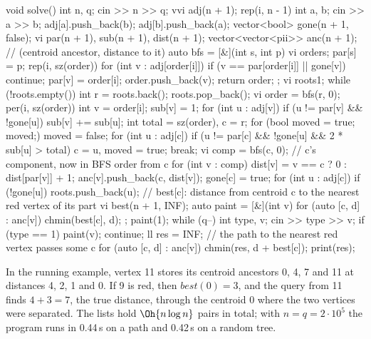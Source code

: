 \begin{code}
void solve() {
    int n, q;
    cin >> n >> q;
    vvi adj(n + 1);
    rep(i, n - 1) {
        int a, b;
        cin >> a >> b;
        adj[a].push_back(b);
        adj[b].push_back(a);
    }
    vector<bool> gone(n + 1, false);
    vi par(n + 1), sub(n + 1), dist(n + 1);
    vector<vector<pii>> anc(n + 1);  // (centroid ancestor, distance to it)
    auto bfs = [&](int s, int p) {
        vi order{s};
        par[s] = p;
        rep(i, sz(order)) for (int v : adj[order[i]]) {
            if (v == par[order[i]] || gone[v]) continue;
            par[v] = order[i];
            order.push_back(v);
        }
        return order;
    };
    vi roots{1};
    while (!roots.empty()) {
        int r = roots.back();
        roots.pop_back();
        vi order = bfs(r, 0);
        per(i, sz(order)) {
            int v = order[i];
            sub[v] = 1;
            for (int u : adj[v])
                if (u != par[v] && !gone[u]) sub[v] += sub[u];
        }
        int total = sz(order), c = r;
        for (bool moved = true; moved;) {
            moved = false;
            for (int u : adj[c])
                if (u != par[c] && !gone[u] && 2 * sub[u] > total) {
                    c = u, moved = true;
                    break;
                }
        }
        vi comp = bfs(c, 0);  // c's component, now in BFS order from c
        for (int v : comp) {
            dist[v] = v == c ? 0 : dist[par[v]] + 1;
            anc[v].push_back({c, dist[v]});
        }
        gone[c] = true;
        for (int u : adj[c])
            if (!gone[u]) roots.push_back(u);
    }
    // best[c]: distance from centroid c to the nearest red vertex of its part
    vi best(n + 1, INF);
    auto paint = [&](int v) {
        for (auto [c, d] : anc[v]) chmin(best[c], d);
    };
    paint(1);
    while (q--) {
        int type, v;
        cin >> type >> v;
        if (type == 1) {
            paint(v);
            continue;
        }
        ll res = INF;  // the path to the nearest red vertex passes some c
        for (auto [c, d] : anc[v]) chmin(res, d + best[c]);
        print(res);
    }
}
\end{code}

In the running example, vertex 11 stores its centroid ancestors 0, 4, 7 and 11 at distances 4, 2, 1 and 0. If 9 is red, then
$\mathit{best}(0) = 3$, and the query from 11 finds $4 + 3 = 7$, the true distance, through the centroid 0 where the two vertices
were separated. The lists hold $\Oh{n \log n}$ pairs in total; with $n = q = 2 \cdot 10^5$ the program runs in 0.44\,s on a path
and 0.42\,s on a random tree.


